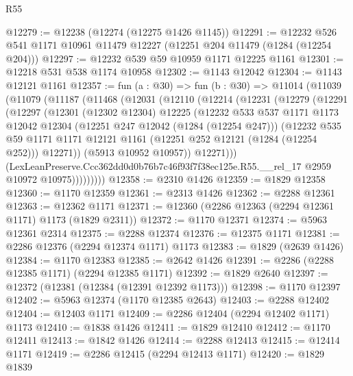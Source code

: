 \begin{lexlean}{R55}
\begin{coremodule}
@12279 := @12238 (@12274 (@12275 @1426 @1145))
@12291 := @12232 @526 @541 @1171 @10961 @11479 @12227 (@12251 @204 @11479 (@1284 (@12254 @204)))
@12297 := @12232 @539 @59 @10959 @1171 @12225 @1161
@12301 := @12218 @531 @538 @1174 @10958
@12302 := @1143 @12042
@12304 := @1143 @12121 @1161
@12357 := fun (a : @30) =>
  fun (b : @30) =>
  @11014
    (@11039
      (@11079
        (@11187
          (@11468
            (@12031
              (@12110
                (@12214
                  (@12231
                    (@12279
                      (@12291
                        (@12297
                          (@12301
                            (@12302 @12304)
                            @12225
                            (@12232
                              @533
                              @537
                              @1171
                              @1173
                              @12042
                              @12304
                              (@12251 @247 @12042 (@1284 (@12254 @247)))
                              (@12232
                                @535
                                @59
                                @1171
                                @1171
                                @12121
                                @1161
                                (@12251 @252 @12121 (@1284 (@12254 @252)))
                                @12271))
                            (@5913 @10952 @10957))
                          @12271)))
                    (LexLeanPreserve.Ccc362dd0d0b76b7c46f93f7f38ec125e.R55.__rel_17
                      @2959
                      @10972
                      @10975)))))))))
@12358 := @2310 @1426
@12359 := @1829 @12358
@12360 := @1170 @12359
@12361 := @2313 @1426
@12362 := @2288 @12361
@12363 := @12362 @1171
@12371 := @12360 (@2286 @12363 (@2294 @12361 @1171) @1173 (@1829 @2311))
@12372 := @1170 @12371
@12374 := @5963 @12361 @2314
@12375 := @2288 @12374
@12376 := @12375 @1171
@12381 := @2286 @12376 (@2294 @12374 @1171) @1173
@12383 := @1829 (@2639 @1426)
@12384 := @1170 @12383
@12385 := @2642 @1426
@12391 := @2286 (@2288 @12385 @1171) (@2294 @12385 @1171)
@12392 := @1829 @2640
@12397 := @12372 (@12381 (@12384 (@12391 @12392 @1173)))
@12398 := @1170 @12397
@12402 := @5963 @12374 (@1170 @12385 @2643)
@12403 := @2288 @12402
@12404 := @12403 @1171
@12409 := @2286 @12404 (@2294 @12402 @1171) @1173
@12410 := @1838 @1426
@12411 := @1829 @12410
@12412 := @1170 @12411
@12413 := @1842 @1426
@12414 := @2288 @12413
@12415 := @12414 @1171
@12419 := @2286 @12415 (@2294 @12413 @1171)
@12420 := @1829 @1839

\end{coremodule}
\end{lexlean}
